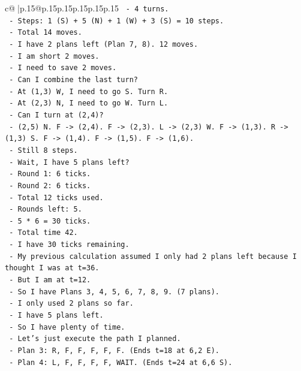 \documentclass{article}
\begin{document}
{\begin{supertabular}{c@{$\;$}|p{.15\linewidth}@{}p{.15\linewidth}p{.15\linewidth}p{.15\linewidth}p{.15\linewidth}p{.15\linewidth}}
{{{\texttt{  {-} 4 turns.} \\
\texttt{  {-} Steps: 1 (S) + 5 (N) + 1 (W) + 3 (S) = 10 steps.} \\
\texttt{  {-} Total 14 moves.} \\
\texttt{  {-} I have 2 plans left (Plan 7, 8). 12 moves.} \\
\texttt{  {-} I am short 2 moves.} \\
\texttt{  {-} I need to save 2 moves.} \\
\texttt{  {-} Can I combine the last turn?} \\
\texttt{  {-} At (1,3) W, I need to go S. Turn R.} \\
\texttt{  {-} At (2,3) N, I need to go W. Turn L.} \\
\texttt{  {-} Can I turn at (2,4)?} \\
\texttt{  {-} (2,5) N. F {-}> (2,4). F {-}> (2,3). L {-}> (2,3) W. F {-}> (1,3). R {-}> (1,3) S. F {-}> (1,4). F {-}> (1,5). F {-}> (1,6).} \\
\texttt{  {-} Still 8 steps.} \\
\texttt{  {-} Wait, I have 5 plans left?} \\
\texttt{  {-} Round 1: 6 ticks.} \\
\texttt{  {-} Round 2: 6 ticks.} \\
\texttt{  {-} Total 12 ticks used.} \\
\texttt{  {-} Rounds left: 5.} \\
\texttt{  {-} 5 * 6 = 30 ticks.} \\
\texttt{  {-} Total time 42.} \\
\texttt{  {-} I have 30 ticks remaining.} \\
\texttt{  {-} My previous calculation assumed I only had 2 plans left because I thought I was at t=36.} \\
\texttt{  {-} But I am at t=12.} \\
\texttt{  {-} So I have Plans 3, 4, 5, 6, 7, 8, 9. (7 plans).} \\
\texttt{  {-} I only used 2 plans so far.} \\
\texttt{  {-} I have 5 plans left.} \\
\texttt{  {-} So I have plenty of time.} \\
\texttt{  {-} Let's just execute the path I planned.} \\
\texttt{  {-} Plan 3: R, F, F, F, F, F. (Ends t=18 at 6,2 E).} \\
\texttt{  {-} Plan 4: L, F, F, F, F, WAIT. (Ends t=24 at 6,6 S).} \\
}}}
\end{supertabular}}
\end{document}
